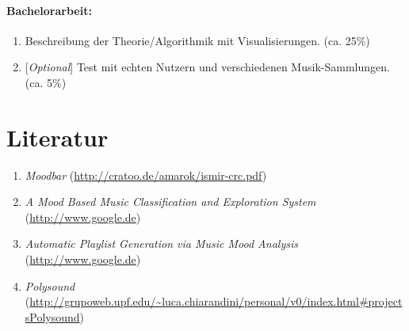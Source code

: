 \documentclass[8pt,a4paper,ngerman]{scrartcl}
\begin{document}
    \paragraph{Bachelorarbeit:}
        \begin{enumerate} 
            \item Beschreibung der Theorie/Algorithmik mit Visualisierungen.  (ca. 25\%)
            \item {[}\emph{Optional}{]} Test mit echten Nutzern und verschiedenen
                Musik-Sammlungen. (ca. 5\%)
        \end{enumerate}

\section{Literatur}
    \begin{enumerate}
        \item \textit{Moodbar} (\url{http://cratoo.de/amarok/ismir-crc.pdf}) \label{label_moodbar}
        \item \textit{A Mood Based Music Classification and Exploration System} (\url{http://www.google.de})
        \item \textit{Automatic Playlist Generation via Music Mood Analysis} (\url{http://www.google.de})
        \item \textit{Polysound} (\url{http://grupoweb.upf.edu/~luca.chiarandini/personal/v0/index.html#projectsPolysound})
    \end{enumerate}
\newpage
\begin{figure}[p]
    \vspace*{+1.0cm}
    \hspace*{-3.0cm}
\end{figure}
\end{document}
